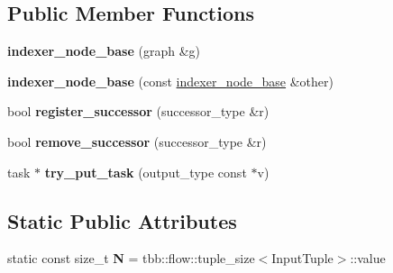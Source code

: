 \subsection*{Public Member Functions}
\begin{DoxyCompactItemize}
\item 
\hypertarget{classinternal_1_1indexer__node__base_a1f3b722678fb36523c81d239b67e5073}{}{\bfseries indexer\+\_\+node\+\_\+base} (graph \&g)\label{classinternal_1_1indexer__node__base_a1f3b722678fb36523c81d239b67e5073}

\item 
\hypertarget{classinternal_1_1indexer__node__base_a00dd91667d720ffbcf8acd22c92cccc6}{}{\bfseries indexer\+\_\+node\+\_\+base} (const \hyperlink{classinternal_1_1indexer__node__base}{indexer\+\_\+node\+\_\+base} \&other)\label{classinternal_1_1indexer__node__base_a00dd91667d720ffbcf8acd22c92cccc6}

\item 
\hypertarget{classinternal_1_1indexer__node__base_ae0e2c8740a1c9950b8a884a432d4de08}{}bool {\bfseries register\+\_\+successor} (successor\+\_\+type \&r)\label{classinternal_1_1indexer__node__base_ae0e2c8740a1c9950b8a884a432d4de08}

\item 
\hypertarget{classinternal_1_1indexer__node__base_a668d3b1565143a8e1ae8acfdae87bab9}{}bool {\bfseries remove\+\_\+successor} (successor\+\_\+type \&r)\label{classinternal_1_1indexer__node__base_a668d3b1565143a8e1ae8acfdae87bab9}

\item 
\hypertarget{classinternal_1_1indexer__node__base_aed57a4ba91e54c57f6420612a917e850}{}task $\ast$ {\bfseries try\+\_\+put\+\_\+task} (output\+\_\+type const $\ast$v)\label{classinternal_1_1indexer__node__base_aed57a4ba91e54c57f6420612a917e850}

\end{DoxyCompactItemize}
\subsection*{Static Public Attributes}
\begin{DoxyCompactItemize}
\item 
\hypertarget{classinternal_1_1indexer__node__base_a642ff1e797d943ccb99a8afdbb1b73b1}{}static const size\+\_\+t {\bfseries N} = tbb\+::flow\+::tuple\+\_\+size$<$Input\+Tuple$>$\+::value\label{classinternal_1_1indexer__node__base_a642ff1e797d943ccb99a8afdbb1b73b1}

\end{DoxyCompactItemize}
